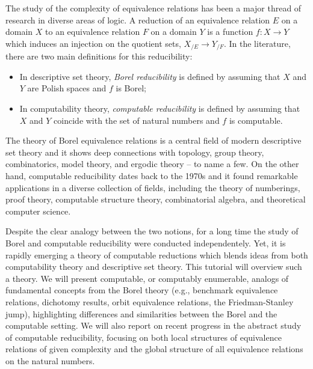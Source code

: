 \documentclass[bsl,meeting]{asl}
\newcommand{\NP}{}
\begin{document}
\thispagestyle{empty}


\NP  
{}


The study of the complexity of equivalence relations has been a major
thread of research in diverse areas of logic. A reduction of an equivalence relation $E$ on a domain $X$ to an equivalence relation $F$ on
a domain $Y$ is a function $f : X \rightarrow Y$ which induces an injection on the quotient sets, $X_{/E}\rightarrow Y_{/F}$.
 In the literature, there are two main definitions for this reducibility: 
\begin{itemize}
\item In descriptive set theory, \emph{Borel reducibility} is defined by assuming that $X$ and $Y$ are Polish spaces and $f$ is Borel;
\item  In computability theory, \emph{computable reducibility} is defined by
assuming that $X$ and $Y$ coincide with the set of natural numbers
and $f$ is computable.
\end{itemize}

The theory of Borel equivalence relations is
a central field of modern descriptive set theory and it shows deep connections with topology, group theory, combinatorics, model theory, and ergodic
theory -- to name a few. On the other hand, computable reducibility dates back to the 1970s and it found remarkable applications in a diverse collection of fields, including the theory of numberings, proof theory, computable structure theory, combinatorial algebra, and theoretical computer science. 


Despite the clear analogy between the two notions, for a long time the study of Borel
and computable reducibility were conducted independentely. Yet, it is rapidly emerging a theory of computable reductions which blends ideas from both computability theory and descriptive set theory.  This tutorial will overview such a theory. We will present computable, or computably enumerable, analogs of fundamental concepts from the Borel theory (e.g., benchmark equivalence relations, dichotomy results,  orbit equivalence relations, the Friedman-Stanley jump), highlighting differences and similarities between  the Borel and the computable setting.  We will also report on recent progress in the abstract study of computable reducibility, focusing on both
 local structures of equivalence relations of given complexity and the global structure of all equivalence relations on the natural numbers.
\end{document}
